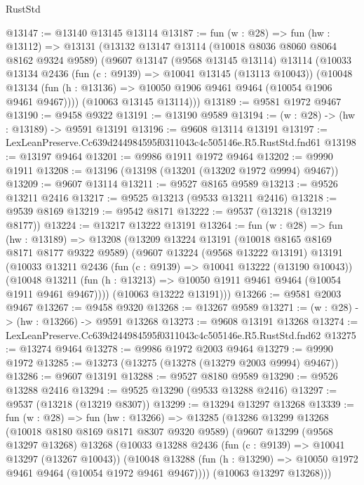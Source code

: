 \begin{lexlean}{RustStd}
\begin{coremodule}
@13147 := @13140 @13145 @13114
@13187 := fun (w : @28) =>
  fun (hw : @13112) =>
  @13131
    (@13132
      @13147
      @13114
      (@10018 @8036 @8060 @8064 @8162 @9324 @9589)
      (@9607
        @13147
        (@9568 @13145 @13114)
        @13114
        (@10033
          @13134
          @2436
          (fun (c : @9139) => @10041 @13145 (@13113 @10043))
          (@10048 @13134 (fun (h : @13136) => @10050 @1906 @9461 @9464 (@10054 @1906 @9461 @9467))))
        (@10063 @13145 @13114)))
@13189 := @9581 @1972 @9467
@13190 := @9458 @9322
@13191 := @13190 @9589
@13194 := (w : @28) -> (hw : @13189) -> @9591 @13191
@13196 := @9608 @13114 @13191
@13197 := LexLeanPreserve.Cc639d244984595f0311043c4c505146e.R5.RustStd.fnd61
@13198 := @13197 @9464
@13201 := @9986 @1911 @1972 @9464
@13202 := @9990 @1911
@13208 := @13196 (@13198 (@13201 (@13202 @1972 @9994) @9467))
@13209 := @9607 @13114
@13211 := @9527 @8165 @9589
@13213 := @9526 @13211 @2416
@13217 := @9525 @13213 (@9533 @13211 @2416)
@13218 := @9539 @8169
@13219 := @9542 @8171
@13222 := @9537 (@13218 (@13219 @8177))
@13224 := @13217 @13222 @13191
@13264 := fun (w : @28) =>
  fun (hw : @13189) =>
  @13208
    (@13209
      @13224
      @13191
      (@10018 @8165 @8169 @8171 @8177 @9322 @9589)
      (@9607
        @13224
        (@9568 @13222 @13191)
        @13191
        (@10033
          @13211
          @2436
          (fun (c : @9139) => @10041 @13222 (@13190 @10043))
          (@10048 @13211 (fun (h : @13213) => @10050 @1911 @9461 @9464 (@10054 @1911 @9461 @9467))))
        (@10063 @13222 @13191)))
@13266 := @9581 @2003 @9467
@13267 := @9458 @9320
@13268 := @13267 @9589
@13271 := (w : @28) -> (hw : @13266) -> @9591 @13268
@13273 := @9608 @13191 @13268
@13274 := LexLeanPreserve.Cc639d244984595f0311043c4c505146e.R5.RustStd.fnd62
@13275 := @13274 @9464
@13278 := @9986 @1972 @2003 @9464
@13279 := @9990 @1972
@13285 := @13273 (@13275 (@13278 (@13279 @2003 @9994) @9467))
@13286 := @9607 @13191
@13288 := @9527 @8180 @9589
@13290 := @9526 @13288 @2416
@13294 := @9525 @13290 (@9533 @13288 @2416)
@13297 := @9537 (@13218 (@13219 @8307))
@13299 := @13294 @13297 @13268
@13339 := fun (w : @28) =>
  fun (hw : @13266) =>
  @13285
    (@13286
      @13299
      @13268
      (@10018 @8180 @8169 @8171 @8307 @9320 @9589)
      (@9607
        @13299
        (@9568 @13297 @13268)
        @13268
        (@10033
          @13288
          @2436
          (fun (c : @9139) => @10041 @13297 (@13267 @10043))
          (@10048 @13288 (fun (h : @13290) => @10050 @1972 @9461 @9464 (@10054 @1972 @9461 @9467))))
        (@10063 @13297 @13268)))

\end{coremodule}
\end{lexlean}
